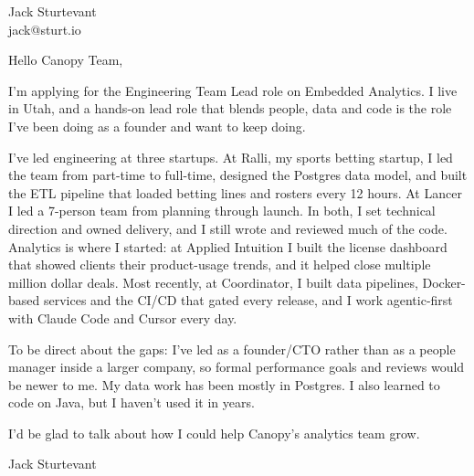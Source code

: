 \documentclass[11pt]{article}
\begin{document}
\raggedright

{\namefont\fontsize{20pt}{24pt}\selectfont Jack Sturtevant}\\[-0.3em]
jack@sturt.io

\vspace{1.2em}

Hello Canopy Team,

I'm applying for the Engineering Team Lead role on Embedded Analytics. I live in Utah, and a hands-on lead role that blends people, data and code is the role I've been doing as a founder and want to keep doing.

I've led engineering at three startups. At Ralli, my sports betting startup, I led the team from part-time to full-time, designed the Postgres data model, and built the ETL pipeline that loaded betting lines and rosters every 12 hours. At Lancer I led a 7-person team from planning through launch. In both, I set technical direction and owned delivery, and I still wrote and reviewed much of the code. Analytics is where I started: at Applied Intuition I built the license dashboard that showed clients their product-usage trends, and it helped close multiple million dollar deals. Most recently, at Coordinator, I built data pipelines, Docker-based services and the CI/CD that gated every release, and I work agentic-first with Claude Code and Cursor every day.

To be direct about the gaps: I've led as a founder/CTO rather than as a people manager inside a larger company, so formal performance goals and reviews would be newer to me. My data work has been mostly in Postgres. I also learned to code on Java, but I haven't used it in years.

I'd be glad to talk about how I could help Canopy's analytics team grow.

\vspace{0.6em}
Jack Sturtevant
\end{document}
